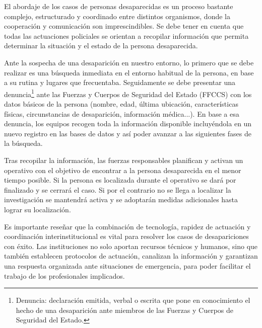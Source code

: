 El abordaje de los casos de personas desaparecidas es un proceso bastante complejo, estructurado y coordinado entre distintos organismos, donde la cooperación y comunicación son imprescindibles. Se debe tener en cuenta que todas las actuaciones policiales se orientan a recopilar información que permita determinar la situación y el estado de la persona desaparecida.

Ante la sospecha de una desaparición en nuestro entorno, lo primero que se debe realizar es una búsqueda inmediata en el entorno habitual de la persona, en base a su rutina y lugares que frecuentaba. Seguidamente se debe presentar una denuncia\footnote{Denuncia: declaración emitida, verbal o escrita que pone en conocimiento el hecho de una desaparición ante miembros de las Fuerzas y Cuerpos de Seguridad del Estado.} ante las Fuerzas y Cuerpos de Seguridad del Estado (FFCCS) con los datos básicos de la persona (nombre, edad, última ubicación, características físicas, circunstancias de desaparición, información médica...). En base a esa denuncia, los equipos recogen toda la información disponible incluyéndola en un nuevo registro en las bases de datos y así poder avanzar a las siguientes fases de la búsqueda. 

Tras recopilar la información, las fuerzas responsables planifican y activan un operativo con el objetivo de encontrar a la persona desaparecida en el menor tiempo posible. Si la persona es localizada durante el operativo se dará por finalizado y se cerrará el caso. Si por el contrario no se llega a localizar la investigación se mantendrá activa y se adoptarán medidas adicionales hasta lograr su localización.


Es importante reseñar que la combinación de tecnología, rapidez de actuación y coordinación interinstitucional es vital para resolver los casos de desapariciones con éxito. Las instituciones no solo aportan recursos técnicos y humanos, sino que también establecen protocolos de actuación, canalizan la información y garantizan una respuesta organizada ante situaciones de emergencia, para poder facilitar el trabajo de los profesionales implicados.

